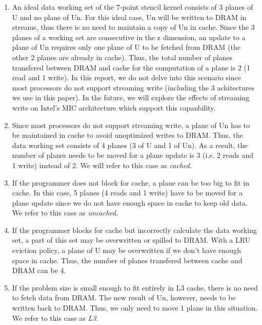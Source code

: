 \documentclass{article}
\begin{document}
\begin{enumerate}
\item An ideal data working set of the 7-point stencil kernel consists of 3 planes of U and no plane of Un.
For this ideal case, Un will be written to DRAM in streams, thus there is no need to maintain a copy of Un in cache.
Since the 3 planes of a working set are consecutive in the z dimension, an update to a plane of Un requires only one plane of U to be fetched from DRAM (the other 2 planes are already in cache).
Thus, the total number of planes transfered between DRAM and cache for the computation of a plane is 2 (1 read and 1 write).
In this report, we do not delve into this scenario since most processors do not support streaming write (including the 3 achitectures we use in this paper).
In the future, we will explore the effects of streaming write on Intel's MIC architecture which support this capanbility.

\item Since most processors do not support streaming write, a plane of Un has to be maintained in cache to avoid unoptimized writes to DRAM. Thus, the data working set consists of 4 planes (3 of U and 1 of Un).
As a result, the number of planes needs to be moved for a plane update is 3 (i.e. 2 reads and 1 write) instead of 2. 
We will refer to this case as {\em cached}.

\item If the programmer does not block for cache, a plane can be too big to fit in cache.
In this case, 5 planes (4 reads and 1 write) have to be moved for a plane update since we do not have enough space in cache to keep old data.
We refer to this case as {\em uncached}.
\item If the programmer blocks for cache but incorrectly calculate the data working set, a part of this set may be overwritten or spilled to DRAM.
With a LRU eviction policy, a plane of U may be overwritten if we don't have enough space in cache.
Thus, the number of planes transfered between cache and DRAM can be 4.
\item If the problem size is small enough to fit entirely in L3 cache, there is no need to fetch data from DRAM.
The new result of Un, however, needs to be written back to DRAM.
Thus, we only need to move 1 plane in this situation.
We refer to this case as {\em L3}.
\end{enumerate}
\end{document}
